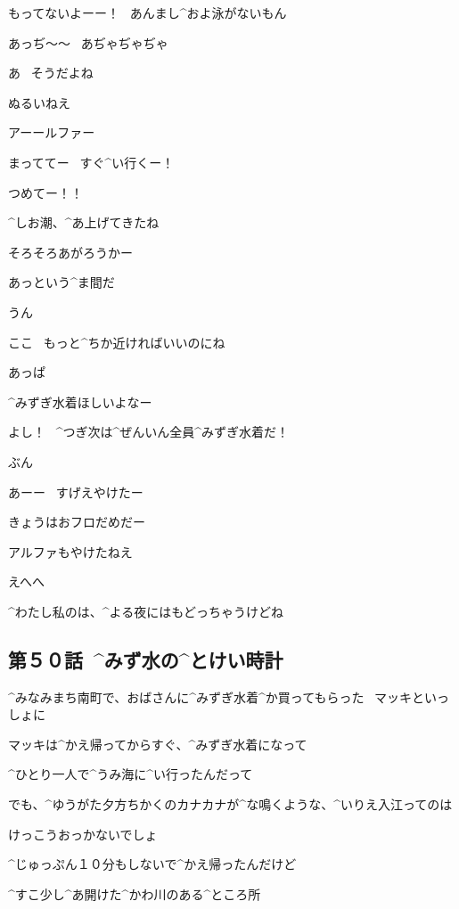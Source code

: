 \Takahiro もってないよーー！
\ あんまし^{およ}{泳}がないもん

\Takahiro あっぢ〜〜
\ あぢゃぢゃぢゃ

\Alpha あ
\ そうだよね

\page[82]
\Makki ぬるいねえ

\Takahiro アーールファー

\Alpha まっててー
\ すぐ^{い}{行}くー！

\page[84]
\Takahiro つめてー！！

\Alpha ^{しお}{潮}、^{あ}{上}げてきたね

\Alpha そろそろあがろうかー

\page[85]
\Takahiro あっという^{ま}{間}だ

\Alpha うん

\Makki ここ
\ もっと^{ちか}{近}ければいいのにね

\Takahiro あっぱ

\Takahiro ^{みずぎ}{水着}ほしいよなー

\Alpha よし！
\ ^{つぎ}{次}は^{ぜんいん}{全員}^{みずぎ}{水着}だ！

\Alpha ぶん

\page[86]
\Takahiro あーー
\ すげえやけたー

\Makki きょうはおフロだめだー

\Takahiro アルファもやけたねえ

\Alpha えへへ

\Alpha ^{わたし}{私}のは、^{よる}{夜}にはもどっちゃうけどね


\subsection{第５０話\ ^{みず}{水}の^{とけい}{時計}}

\page[90]
\Takahiro ^{みなみまち}{南町}で、おばさんに^{みずぎ}{水着}^{か}{買}ってもらった
\ マッキといっしょに

\Takahiro マッキは^{かえ}{帰}ってからすぐ、^{みずぎ}{水着}になって

\Takahiro ^{ひとり}{一人}で^{うみ}{海}に^{い}{行}ったんだって

\page[91]
\Takahiro でも、^{ゆうがた}{夕方}ちかくのカナカナが^{な}{鳴}くような、^{いりえ}{入江}ってのは

\Takahiro けっこうおっかないでしょ

\Takahiro ^{じゅっぷん}{１０分}もしないで^{かえ}{帰}ったんだけど

\Takahiro ^{すこ}{少}し^{あ}{開}けた^{かわ}{川}のある^{ところ}{所}


